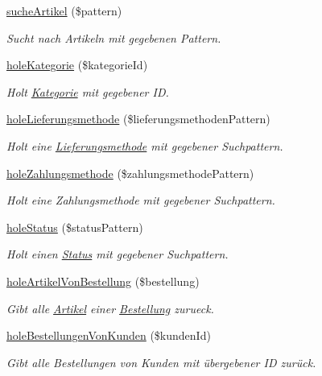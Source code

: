 \begin{DoxyCompactItemize}
\hyperlink{classDatabaseModel_ac2dc51ab0cc99eef20d02b1945ef740b}{suche\-Artikel} (\$pattern)
\begin{DoxyCompactList}\small\item\em \-Sucht nach \-Artikeln mit gegebenen \-Pattern. \end{DoxyCompactList}\item 
\hyperlink{classDatabaseModel_a05660ada8d2113d1a2f886de27017638}{hole\-Kategorie} (\$kategorie\-Id)
\begin{DoxyCompactList}\small\item\em \-Holt \hyperlink{classKategorie}{\-Kategorie} mit gegebener \-I\-D. \end{DoxyCompactList}\item 
\hyperlink{classDatabaseModel_a233a6064cc83947926f5534f3b2ad145}{hole\-Lieferungsmethode} (\$lieferungsmethoden\-Pattern)
\begin{DoxyCompactList}\small\item\em \-Holt eine \hyperlink{classLieferungsmethode}{\-Lieferungsmethode} mit gegebener \-Suchpattern. \end{DoxyCompactList}\item 
\hyperlink{classDatabaseModel_a7c7ac6b9730d97d09c67f01e013d14d6}{hole\-Zahlungsmethode} (\$zahlungsmethode\-Pattern)
\begin{DoxyCompactList}\small\item\em \-Holt eine \-Zahlungsmethode mit gegebener \-Suchpattern. \end{DoxyCompactList}\item 
\hyperlink{classDatabaseModel_acbbf506e57f6001432bcca18cf2c39f7}{hole\-Status} (\$status\-Pattern)
\begin{DoxyCompactList}\small\item\em \-Holt einen \hyperlink{classStatus}{\-Status} mit gegebener \-Suchpattern. \end{DoxyCompactList}\item 
\hyperlink{classDatabaseModel_ab8fb5d8b2930d8056ae3c556563e9f0f}{hole\-Artikel\-Von\-Bestellung} (\$bestellung)
\begin{DoxyCompactList}\small\item\em \-Gibt alle \hyperlink{classArtikel}{\-Artikel} einer \hyperlink{classBestellung}{\-Bestellung} zurueck. \end{DoxyCompactList}\item 
\hyperlink{classDatabaseModel_a5cf2e044bcb65f00b33eb238edc80931}{hole\-Bestellungen\-Von\-Kunden} (\$kunden\-Id)
\begin{DoxyCompactList}\small\item\em \-Gibt alle \-Bestellungen von \-Kunden mit übergebener \-I\-D zurück. \end{DoxyCompactList}\item 

\end{DoxyCompactItemize}
